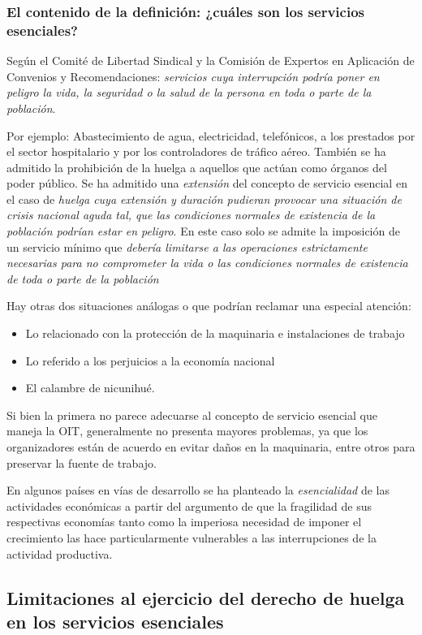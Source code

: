 \documentclass[spanish,12pt,a4paper,titlepage]{report}
\begin{document}
\subsubsection{El contenido de la definición: ¿cuáles son los servicios 
esenciales?}

Según el Comité de Libertad Sindical y la Comisión de Expertos en Aplicación de Convenios y Recomendaciones: \textit{servicios cuya interrupción podría poner en peligro la vida, la seguridad o la salud de la persona en toda o parte de la población}.

Por ejemplo: Abastecimiento de agua, electricidad, telefónicos, a los prestados por el sector hospitalario y por los controladores de tráfico aéreo. También se ha admitido la prohibición de la huelga a aquellos que actúan como órganos del poder público. Se ha admitido una \textit{extensión} del concepto de servicio esencial en el caso de \textit{huelga cuya extensión y duración pudieran provocar una situación de crisis nacional aguda tal, que las condiciones normales de existencia de la población podrían estar en peligro}. En este caso solo se admite la imposición de un servicio mínimo que \textit{debería limitarse a las operaciones estrictamente necesarias para no comprometer la vida o las condiciones normales de existencia de toda o parte de la población}

Hay otras dos situaciones análogas o que podrían reclamar una especial atención:
\begin{itemize}
\item Lo relacionado con la protección de la maquinaria e instalaciones de trabajo
\item Lo referido a los perjuicios a la economía nacional
\item El calambre de nicunihué.
\end{itemize}

Si bien la primera no parece adecuarse al concepto de servicio esencial que maneja la OIT, generalmente no presenta mayores problemas, ya que los organizadores están de acuerdo en evitar daños en la maquinaria, entre otros para preservar la fuente de trabajo.

En algunos países en vías de desarrollo se ha planteado la \textit{esencialidad} de las actividades económicas a partir del argumento de que la fragilidad de sus respectivas economías tanto como la imperiosa necesidad de imponer el crecimiento las hace particularmente vulnerables a las interrupciones de la actividad productiva. 

\subsection{Limitaciones al ejercicio del derecho de huelga en los servicios esenciales}
\end{document}
